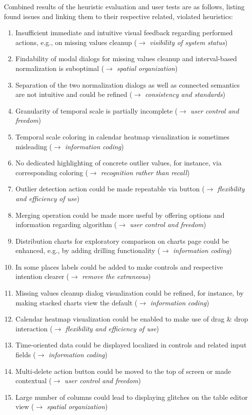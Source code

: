 Combined results of the heuristic evaluation and user tests are as follows, listing found issues and linking them to their respective related, violated heuristics:

\begin{enumerate}
  \item Insufficient immediate and intuitive visual feedback regarding performed actions, e.g., on missing values cleanup ($\rightarrow$ \emph{visibility of system status})
  \item Findability of modal dialogs for missing values cleanup and interval-based normalization is suboptimal ($\rightarrow$ \emph{spatial organization})
  \item Separation of the two normalization dialogs as well as connected semantics are not intuitive and could be refined ($\rightarrow$ \emph{consistency and standards})
  \item Granularity of temporal scale is partially incomplete ($\rightarrow$ \emph{user control and freedom})
  \item Temporal scale coloring in calendar heatmap visualization is sometimes misleading ($\rightarrow$ \emph{information coding})
  \item No dedicated highlighting of concrete outlier values, for instance, via corresponding coloring ($\rightarrow$ \emph{recognition rather than recall})
  \item Outlier detection action could be made repeatable via button ($\rightarrow$ \emph{flexibility and efficiency of use})
  \item Merging operation could be made more useful by offering options and information regarding algorithm ($\rightarrow$ \emph{user control and freedom})
  \item Distribution charts for exploratory comparison on charts page could be enhanced, e.g., by adding drilling functionality ($\rightarrow$ \emph{information coding})
  \item In some places labels could be added to make controls and respective intention clearer ($\rightarrow$ \emph{remove the extraneous})
  \item Missing values cleanup dialog visualization could be refined, for instance, by making stacked charts view the default ($\rightarrow$ \emph{information coding})
  \item Calendar heatmap visualization could be enabled to make use of drag \& drop interaction ($\rightarrow$ \emph{flexibility and efficiency of use})
  \item Time-oriented data could be displayed localized in controls and related input fields ($\rightarrow$ \emph{information coding})
  \item Multi-delete action button could be moved to the top of screen or made contextual ($\rightarrow$ \emph{user control and freedom})
  \item Large number of columns could lead to displaying glitches on the table editor view ($\rightarrow$ \emph{spatial organization})
\end{enumerate}

